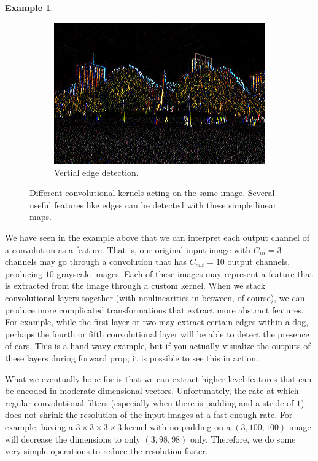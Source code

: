 \documentclass{article}
\theoremstyle{definition}
\newtheorem{example}{Example}[section]
\theoremstyle{remark}
\theoremstyle{definition}
\begin{document}
\begin{example}
\begin{figure}[hbt!]
\begin{subfigure}[b]{0.32\textwidth}
            \includegraphics[width=\textwidth]{img/OpenCV/Vertical.png}
            \caption{Vertial edge detection. }
            \label{fig:vertical_edge}
        \end{subfigure} 

        \caption{Different convolutional kernels acting on the same image. Several useful features like edges can be detected with these simple linear maps. }
        \label{fig:feature_extraction}
    \end{figure}
    \end{example}

    We have seen in the example above that we can interpret each output channel of a convolution as a feature. That is, our original input image with $C_{in} = 3$ channels may go through a convolution that has $C_{out} = 10$ output channels, producing $10$ grayscale images. Each of these images may represent a feature that is extracted from the image through a custom kernel. When we stack convolutional layers together (with nonlinearities in between, of course), we can produce more complicated transformations that extract more abstract features. For example, while the first layer or two may extract certain edges within a dog, perhaps the fourth or fifth convolutional layer will be able to detect the presence of ears. This is a hand-wavy example, but if you actually visualize the outputs of these layers during forward prop, it is possible to see this in action.  

    What we eventually hope for is that we can extract higher level features that can be encoded in moderate-dimensional vectors. Unfortunately, the rate at which regular convolutional filters (especially when there is padding and a stride of $1$) does not shrink the resolution of the input images at a fast enough rate. For example, having a $3 \times 3 \times 3 \times 3$ kernel with no padding on a $(3, 100, 100)$ image will decrease the dimensions to only $(3, 98, 98)$ only. Therefore, we do some very simple operations to reduce the resolution faster. 
\end{document}
